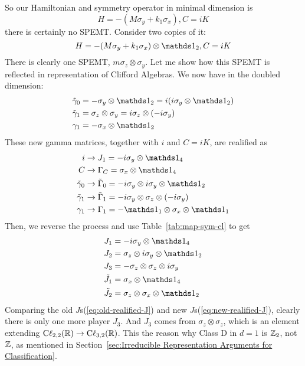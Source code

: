 So our Hamiltonian and symmetry operator in minimal dimension is
\begin{equation}
    H = -(M\sigma_y + k_1\sigma_x), C=iK
\end{equation}
there is certainly no SPEMT. Consider two copies of it:
\begin{equation}
    H = -(M\sigma_y + k_1\sigma_x)\otimes\id_2, C=iK
\end{equation}
There is clearly one SPEMT, $m\sigma_z\otimes\sigma_y$. Let me show how this
SPEMT is reflected in representation of Clifford Algebras. We now have in the
doubled dimension:
\begin{equation}
\begin{aligned}
    \tilde{\gamma}_0 &= -\sigma_y\otimes\id_2 = i(i\sigma_y\otimes\id_2) \\
    \tilde{\gamma}_1 &= \sigma_z\otimes\sigma_y = i\sigma_z\otimes(-i\sigma_y)
    \\
    \gamma_1 &= -\sigma_x\otimes\id_2
\end{aligned}
\end{equation}
These new gamma matrices, together with $i$ and $C=iK$, are realified as
\begin{equation}
\begin{aligned}
    i &\to J_1= -i\sigma_y\otimes \id_4 \\
    C &\to \Gamma_C = \sigma_x\otimes\id_4 \\
    \tilde{\gamma}_0 &\to \tilde{\Gamma}_0 = -i\sigma_y\otimes
    i\sigma_y\otimes\id_2 \\
    \tilde{\gamma}_1 &\to \tilde{\Gamma}_1 = -i\sigma_y\otimes\sigma_z\otimes
    (-i\sigma_y) \\
    \gamma_1 &\to \Gamma_1 = -\id_1\otimes\sigma_x\otimes\id_1
\end{aligned}
\end{equation}
Then, we reverse the process and use Table~\ref{tab:map-sym-cl} to get
\begin{equation}
\begin{aligned}
    \label{eq:new-realified-J}
    J_1 &= -i\sigma_y \otimes\id_4 \\
    J_2 &= \sigma_z\otimes i\sigma_y \otimes \id_2 \\
    J_3 &= -\sigma_z\otimes\sigma_z\otimes i\sigma_y \\
    \tilde{J}_1 &= \sigma_x\otimes\id_4 \\
    \tilde{J}_2 &= \sigma_z\otimes\sigma_x\otimes\id_2
\end{aligned}
\end{equation}
Comparing the old $J$s(\ref{eq:old-realified-J}) and new
$J$s(\ref{eq:new-realified-J}), clearly there is only one more player $J_3$. And
$J_3$ comes from $\sigma_z\otimes\sigma_z$, which is an element extending
$\mathrm{C\ell}_{2,2}(\mathbb{R})\to \mathrm{C\ell}_{3,2}(\mathbb{R})$. This the reason why
Class $\mathrm{D}$ in $d=1$ is $\mathbb{Z}_2$, not $\mathbb{Z}$, as mentioned in
Section~\ref{sec:Irreducible Representation Arguments for Classification}.
